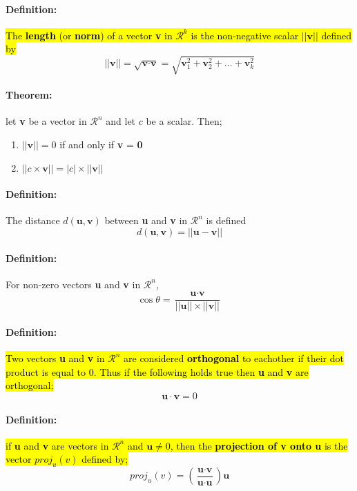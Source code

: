 \documentclass[12pt]{article}
\newenvironment{theorem}{\paragraph{Theorem:\hfill}}{\hfill}
\newenvironment{definition}{\paragraph{Definition: }}{\hfill}
\begin{document}
\begin{definition}
	\hl{The \textbf{length} (or \textbf{norm}) of a vector \textbf{v} in $\mathcal{R}^k$ is the non-negative scalar $||\textbf{v}||$ defined by}
	\[
		||\textbf{v}|| = \sqrt{\textbf{v} \cdot \textbf{v}} = 
		\sqrt{\textbf{v}_1^2 + \textbf{v}_2^2 + \dots + \textbf{v}_k^2}
	\]

\end{definition}

\begin{theorem}
	let \textbf{v} be a vector in $\mathcal{R}^n$ and let $c$ be a scalar. Then;
	
	\begin{enumerate}
		\item $||\textbf{v}|| = 0$ if and only if \textbf{v} = \textbf{0}
		\item $||c \times \textbf{v}|| = |c| \times ||\textbf{v}||$
	\end{enumerate}
\end{theorem}

\begin{definition}
	The distance $d(\textbf{u}, \textbf{v})$ between \textbf{u} and \textbf{v} in $\mathcal{R}^n$ is defined
	\[
		d(\textbf{u}, \textbf{v}) = ||\textbf{u} - \textbf{v}||
	\]
\end{definition}


\begin{definition}
	For non-zero vectors \textbf{u} and \textbf{v} in $\mathcal{R}^n$,
	\[
		\cos \theta = 
			\frac{\textbf{u} \cdot \textbf{v}}{||\textbf{u}|| \times ||\textbf{v}||}
	\]
\end{definition}


\begin{definition}
	\hl{Two vectors \textbf{u} and \textbf{v} in $\mathcal{R}^n$ are considered \textbf{orthogonal} to eachother if their dot product is equal to 0. Thus if the following holds true then \textbf{u} and \textbf{v} are orthogonal;}
	\[
		\textbf{u} \cdot \textbf{v} = 0
	\]
\end{definition}

\begin{definition}
	\hl{if \textbf{u} and \textbf{v} are vectors in $\mathcal{R}^n$ and $\textbf{u} \neq 0$, then the \textbf{projection of v onto u} is the vector $proj_u(v)$ defined by;}
	\[
	proj_u(v) = 
	\left( 
		\frac{\textbf{u} \cdot \textbf{v}}{\textbf{u} \cdot \textbf{u}} 
	\right) \textbf{u}
	\]
\end{definition}
\newpage
\end{document}
